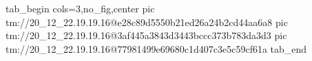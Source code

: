  
 
 
 
 

\qqSecOrig


\ifcmt
  tab_begin cols=3,no_fig,center
    pic tm://20_12_22.19.19.16@e28c89d5550b21ed26a24b2cd44aa6a8
    pic tm://20_12_22.19.19.16@3af445a3843d3443bccc373b783da3d3
    pic tm://20_12_22.19.19.16@77981499e69680c1d407c3e5c59cf61a
  tab_end
\fi


